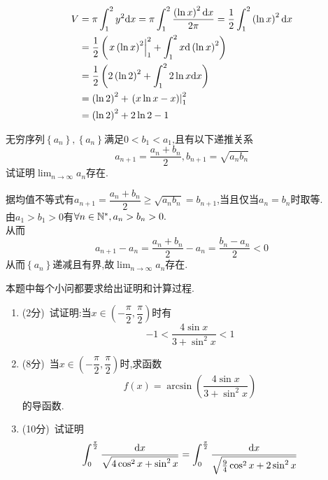 \documentclass{ctexart}
\begin{document}
\begin{solution}[Solution.]
    \begin{align*}
        V
        &= \pi\int_1^2{y^2\mathrm{d} x}=\pi\int_1^2{\dfrac{\left(\ln x\right)^2\mathrm{d} x}{2\pi}}=\dfrac{1}{2}\int_1^2\left(\ln x\right)^2\mathrm{d} x \\
        &= \dfrac{1}{2}\left(\left.x\left(\ln x\right)^2\right|_1^2+\int_1^2x\mathrm{d}\left(\ln x\right)^2\right) \\
        &= \dfrac{1}{2}\left(2\left(\ln 2\right)^2+\int_1^2 2\ln x\mathrm{d} x\right) \\
        &= \left(\ln 2\right)^2+\left.\left(x\ln x-x\right)\right|_1^2 \\
        &= \left(\ln 2\right)^2+2\ln2-1
    \end{align*}
\end{solution}
\begin{problem}[7.(10分)]
    无穷序列$\left\{a_n\right\},\left\{a_n\right\}$满足$0<b_1<a_1$,且有以下递推关系$$a_{n+1}=\dfrac{a_n+b_n}{2},b_{n+1}=\sqrt{a_nb_n}$$试证明$\displaystyle\lim_{n\to\infty}{a_n}$存在.
\end{problem}
\begin{solution}[Proof.]
    据均值不等式有$a_{n+1}=\dfrac{a_n+b_n}{2}\geqslant\sqrt{a_nb_n}=b_{n+1}$,当且仅当$a_n=b_n$时取等.\\
    由$a_1>b_1>0$有$\forall n\in\mathbb{N}^*,a_n>b_n>0.$\\
    从而$$a_{n+1}-a_n=\dfrac{a_n+b_n}{2}-a_n=\dfrac{b_n-a_n}{2}<0$$
    从而$\left\{a_n\right\}$递减且有界,故$\displaystyle\lim_{n\to\infty}{a_n}$存在.
\end{solution}
\begin{problem}[8.(20分)]
    本题中每个小问都要求给出证明和计算过程.
        \begin{enumerate}[label=\textbf{(\arabic*)}]
            \item (2分)\ 试证明:当$x\in\left(-\dfrac{\pi}{2},\dfrac{\pi}{2}\right)$时有$$-1<\dfrac{4\sin{x}}{3+\sin^2{x}}<1$$
            \item (8分)\ 当$x\in\left(-\dfrac{\pi}{2},\dfrac{\pi}{2}\right)$时,求函数$$f(x)=\arcsin{\left(\dfrac{4\sin{x}}{3+\sin^2{x}}\right)}$$的导函数.
            \item (10分)\ 试证明$$\int_{0}^{\frac{\pi}{2}}{\dfrac{\mathrm{d} x}{\sqrt{4\cos^2{x}+\sin^2{x}}}}=\int_{0}^{\frac{\pi}{2}}{\dfrac{\mathrm{d} x}{\sqrt{\frac{9}{4}\cos^2{x}+2\sin^2{x}}}}$$
        \end{enumerate}
\end{problem}
\end{document}
